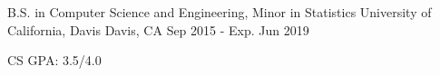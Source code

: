 

\begin{cventries}

  \cventry
    {B.S. in Computer Science and Engineering, Minor in Statistics} %
    {University of California, Davis} %
    {Davis, CA} %
    {Sep 2015 - Exp. Jun 2019} %
    {
      \begin{cvitems} %
        \item {CS GPA: 3.5/4.0}
      \end{cvitems}
    }

\end{cventries}
